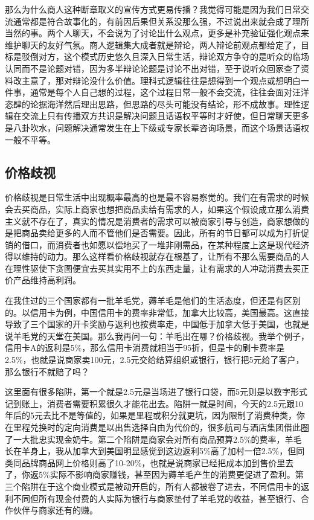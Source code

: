 \documentclass[
  letterpaper,
  DIV=11,
  numbers=noendperiod]{scrreprt}
\begin{document}
那么为什么商人这种断章取义的宣传方式更易传播？我觉得可能是因为我们日常交流通常都是符合故事化的，有前因后果但关系没那么强，不过说出来就会成了理所当然的事。两个人聊天，不会说为了讨论出什么观点，更多是补充验证强化观点来维护聊天的友好气氛。商人逻辑集大成者就是辩论，两人辩论前观点都给定了，目标是驳倒对方，这个模式历史悠久且深入日常生活，辩论双方争夺的是听众的临场认同而不是论题对错，因为多半辩论论题是讨论不出对错，至于说听众回家查了资料改主意了，那对辩论没什么价值。理科式逻辑往往是想得到一个观点或想明白一件事，通常是每个人自己想的过程，这个过程日常一般不会交流，往往会面对汪洋恣肆的论据海洋然后理出思路，但思路的尽头可能没有结论，形不成故事。理性逻辑在交流上只有传播双方共识是解决问题且话语权平等时才好使，但日常聊天更多是八卦吹水，问题解决通常发生在上下级或专家长辈咨询场景，而这个场景话语权一般不平等。

\subsection{价格歧视}\label{ux4ef7ux683cux6b67ux89c6}

价格歧视是日常生活中出现概率最高的也是最不容易察觉的。我们在有需求的时候会去买商品，实际上商家也想把商品卖给有需求的人，如果这个假设成立那么消费主义就不存在了，真实的情况是消费者的需求可以被商家引导与创造，商家想做的是把商品卖给更多的人而不管他们是否需要。因此，所有的节日都可以成为打折促销的借口，而消费者也如愿以偿地买了一堆非刚需品，在某种程度上这是现代经济得以维持的动力。那么这样看价格歧视就存在根基了，让所有不那么需要商品的人在理性驱使下贪图便宜去买其实用不上的东西走量，让有需求的人冲动消费去买正价产品维持高利润。

在我住过的三个国家都有一批羊毛党，薅羊毛是他们的生活态度，但还是有区别的。以信用卡为例，中国信用卡的费率非常低，加拿大比较高，美国最高。这直接导致了三个国家的开卡奖励与返利也按费率走，中国低于加拿大低于美国，也就是说羊毛党的天堂在美国。那么我再问一句：羊毛出在哪？价格歧视。我举个例子，信用卡A的返利是5\%，那么信用卡消费就相当于95折，但是卡的刷卡费率是2.5\%，也就是说商家卖100元，2.5元交给结算组织或银行，银行把5元给了客户，那么银行不就赔了吗？

这里面有很多陷阱，第一个就是2.5元是当场进了银行口袋，而5元则是以数字形式记到账上，消费者需要积累很久才能花出去。陷阱一就是时间，今天的2.5元跟10年后的5元去比不是等值的，如果是里程或积分就更坑，因为限制了消费种类，你在里程兑换时的定向消费是以出售选择自由为代价的，很多航司与酒店集团借此圈了一大批忠实现金奶牛。第二个陷阱是商家会对所有商品预算2.5\%的费率，羊毛长在羊身上，我从加拿大到美国明显感觉到这边返利5\%高了加村一倍2.5\%，但同类同品牌商品网上价格则高了10-20\%，也就是说商家已经把成本加到售价里去了，你返5\%实际不影响商家赚钱，甚至因为薅羊毛产生的消费更促进了盈利。第三个陷阱在于这个商业模式是被动开启的，所有人都被卷了进去，不同信用卡的返利不同但所有现金付费的人实际为银行与商家垫付了羊毛党的收益，甚至银行、合作伙伴与商家还有的赚。
\end{document}
